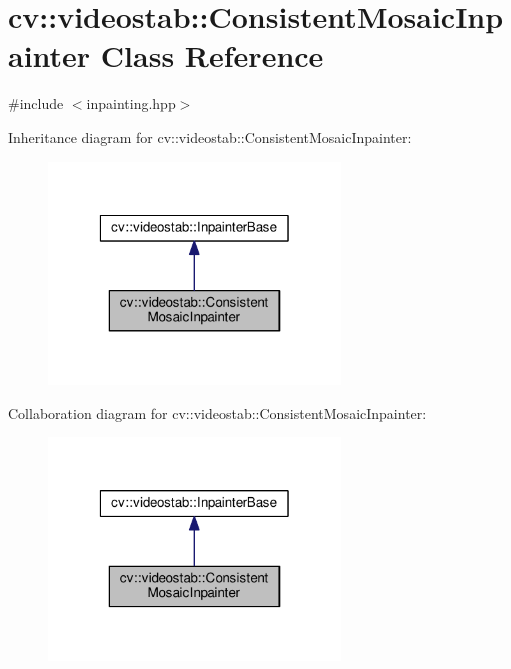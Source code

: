 \hypertarget{classcv_1_1videostab_1_1ConsistentMosaicInpainter}{\section{cv\-:\-:videostab\-:\-:Consistent\-Mosaic\-Inpainter Class Reference}
\label{classcv_1_1videostab_1_1ConsistentMosaicInpainter}
}


{\ttfamily \#include $<$inpainting.\-hpp$>$}



Inheritance diagram for cv\-:\-:videostab\-:\-:Consistent\-Mosaic\-Inpainter\-:\nopagebreak
\begin{figure}[H]
\begin{center}
\leavevmode
\includegraphics[width=220pt]{classcv_1_1videostab_1_1ConsistentMosaicInpainter__inherit__graph}
\end{center}
\end{figure}


Collaboration diagram for cv\-:\-:videostab\-:\-:Consistent\-Mosaic\-Inpainter\-:\nopagebreak
\begin{figure}[H]
\begin{center}
\leavevmode
\includegraphics[width=220pt]{classcv_1_1videostab_1_1ConsistentMosaicInpainter__coll__graph}
\end{center}
\end{figure}
